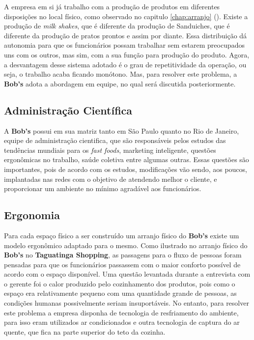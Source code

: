 			A empresa em si já trabalho com a produção de produtos em diferentes disposições no local físico, como observado no capitulo \ref{chap:arranjo} (). Existe a produção de \emph{milk shakes}, que é diferente da produção de Sanduiches, que é diferente da produção de pratos prontos e assim por diante. Essa distribuição dá autonomia para que os funcionários possam trabalhar sem estarem preocupados uns com os outros, mas sim, com a sua função para produção do produto. Agora, a desvantagem desse sistema adotado é o grau de repetitividade da operação, ou seja, o trabalho acaba ficando monótono. Mas, para resolver este problema, a \textbf{Bob’s} adota a abordagem em equipe, no qual será discutida posteriormente.

		\subsection[Administração Científica]{Administração Científica}
		\label{sec:organizacao_ac}

			A \textbf{Bob’s} possui em sua matriz tanto em São Paulo quanto no Rio de Janeiro, equipe de administração cientifica, que são responsáveis pelos estudos das tendências mundiais para os \emph{fast foods}, marketing inteligente, questões ergonômicas no trabalho, saúde coletiva entre algumas outras. Essas questões são importantes, pois de acordo com os estudos, modificações vão sendo, aos poucos, implantadas nas redes com o objetivo de atendendo melhor o cliente, e proporcionar um ambiente no mínimo agradável aos funcionários. \cite{osman}

		\subsection[Ergonomia]{Ergonomia}
		\label{sec:organizacao_ergonomia}

			Para cada espaço físico a ser construído um arranjo físico do \textbf{Bob’s} existe um modelo ergonômico adaptado para o mesmo. Como ilustrado no arranjo físico do \textbf{Bob’s} no \textbf{Taguatinga Shopping}, as passagens para o fluxo de pessoas foram pensadas para que os funcionários passassem com o maior conforto possível de acordo com o espaço disponível. Uma questão levantada durante a entrevista com o gerente foi o calor produzido pelo cozinhamento dos produtos, pois como o espaço era relativamente pequeno com uma quantidade grande de pessoas, as condições humanas possivelmente seriam insuportáveis. No entanto, para resolver este problema a empresa disponha de tecnologia de resfriamento do ambiente, para isso eram utilizados ar condicionados e outra tecnologia de captura do ar quente, que fica na parte superior do teto da cozinha.

